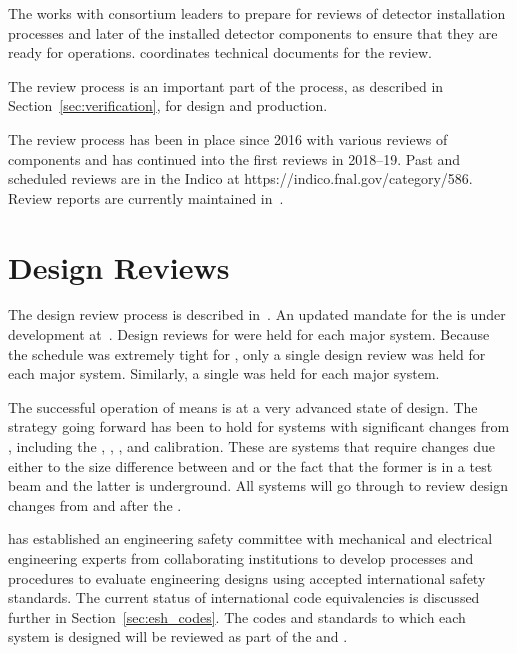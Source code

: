 The  works with consortium leaders to prepare for reviews of
detector installation processes %
and later of the installed detector components to
ensure that they are ready for operations.   coordinates
technical documents for the   review.

The review process is an important part of the  
process, as described in Section~\ref{sec:verification}, for
design and production.

The review process has been in place since 2016 with various reviews
of  components and has continued into the first
 reviews in 2018--19. Past and scheduled reviews are in
the  Indico at https://indico.fnal.gov/category/586.
Review reports are currently maintained in~.

\section{Design Reviews}

The  design review process is described
in~. An updated mandate for the   is under
development at~\cite{bib:cernedms2173197}. %
Design reviews
for  were held for each major system. Because the
schedule was extremely tight for , only a single
design review was held for each major system. Similarly, a single
 was held for each major system.

The successful operation of  means  is at
a very advanced state of design. The strategy going forward has been
to hold  for systems with significant changes from
, including the , ,
, and calibration. These are systems that require changes
due either to the size difference between  and 
or the fact that the former is in a test beam and the latter is underground. All
systems will go through  to review design changes from
 and  after the .

 has established an engineering safety committee with
mechanical and electrical engineering experts from collaborating
institutions to develop processes and procedures to evaluate
engineering designs using accepted international safety standards. The
current status of international code equivalencies is discussed
further in Section~\ref{sec:esh_codes}. The codes and standards to
which each system is designed will be reviewed as part of the
 and .

